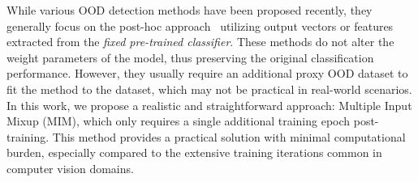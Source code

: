 \documentclass[letterpaper]{article} %
\begin{document}
While various OOD detection methods have been proposed recently, they generally focus on the post-hoc approach~\cite{MSP, mahalanobis, liang2017enhancing} utilizing output vectors or features extracted from the \textit{fixed pre-trained classifier}.
These methods do not alter the weight parameters of the model, thus preserving the original classification performance.
However, they usually require an additional proxy OOD dataset to fit the method to the dataset, which may not be practical in real-world scenarios.
In this work, we propose a realistic and straightforward approach: Multiple Input Mixup (MIM), which only requires a single additional training epoch post-training.
This method provides a practical solution with minimal computational burden, especially compared to the extensive training iterations common in computer vision domains.
\end{document}
